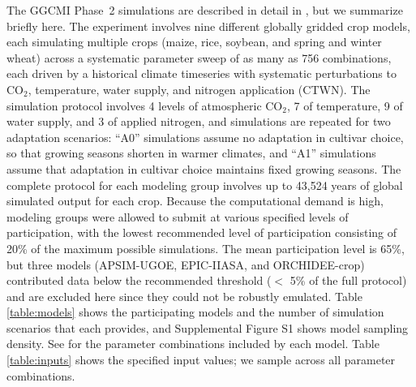 \documentclass[gmdd]{copernicus} %
\begin{document}
The GGCMI Phase~2 simulations are described in detail in \citet{franke2020ctwnexperiment}, but we summarize briefly here. 
The experiment involves nine different globally gridded crop models, each simulating multiple crops (maize, rice, soybean, and spring and winter wheat) across a systematic parameter sweep of as many as 756 combinations, each driven by a historical climate timeseries with systematic perturbations to CO$_2$, temperature, water supply, and nitrogen application (CTWN). 
The simulation protocol involves 4 levels of atmospheric CO$_2$, 7 of temperature, 9 of water supply, and 3 of applied nitrogen, and simulations are repeated for two adaptation scenarios: ``A0'' simulations assume no adaptation in cultivar choice, so that growing seasons shorten in warmer climates, and ``A1'' simulations assume that adaptation in cultivar choice maintains fixed growing seasons.
The complete protocol for each modeling group involves up to 43,524 years of global simulated output for each crop. 
Because the computational demand is high, modeling groups were allowed to submit at various specified levels of participation, with the lowest recommended level of participation consisting of 20\% of the maximum possible simulations. 
The mean participation level is 65\%, but three models (APSIM-UGOE, EPIC-IIASA, and ORCHIDEE-crop) contributed data below the recommended threshold ($<$ 5\% of the full protocol) and are excluded here since they could not be robustly emulated. 
Table \ref{table:models} shows the participating models and the number of simulation scenarios that each provides, and Supplemental Figure S1 shows model sampling density. 
See \citet{franke2020ctwnexperiment} for the parameter combinations included by each model.
Table \ref{table:inputs} shows the specified input values; we sample across all parameter combinations. 
\end{document}
